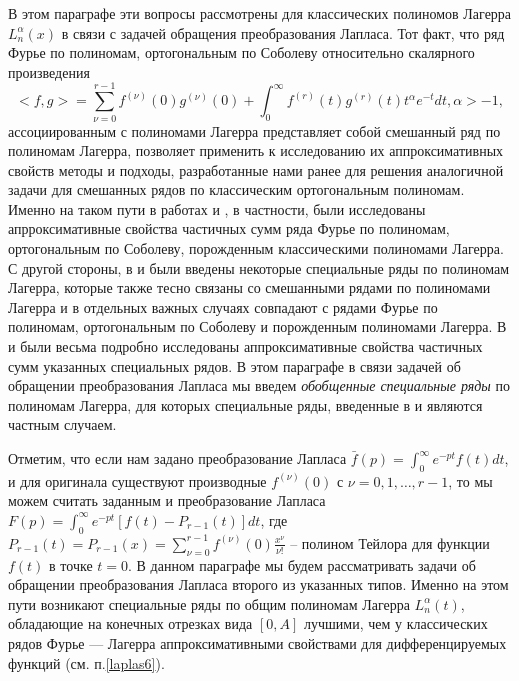 В этом параграфе эти вопросы рассмотрены для классических полиномов Лагерра $L_n^\alpha(x)$ в связи с задачей обращения преобразования Лапласа. Тот факт, что ряд Фурье по полиномам, ортогональным по Соболеву относительно скалярного произведения
\begin{equation}\label{laplas-1.1}
<f,g>=\sum_{\nu=0}^{r-1}f^{(\nu)}(0)g^{(\nu)}(0)+\int_0^\infty f^{(r)}(t)g^{(r)}(t)t^\alpha e^{-t}dt, \alpha>-1,
\end{equation}
ассоциированным с полиномами Лагерра представляет собой смешанный ряд по полиномам Лагерра, позволяет применить к исследованию их аппроксимативных свойств  методы и подходы, разработанные нами ранее \cite{laplas-Shar13, laplas-Shar14, sobleg-Shar15, sobleg-Shar16} для решения аналогичной задачи для смешанных рядов по классическим ортогональным полиномам. Именно на таком пути в работах  \cite{laplas-Shar11} и \cite{sobleg-SHII}, в частности, были исследованы апрроксимативные свойства частичных сумм ряда Фурье по полиномам, ортогональным по Соболеву, порожденным классическими полиномами Лагерра. С другой стороны, в \cite{laplas-Shar11} и \cite{sobleg-SHII} были введены некоторые специальные ряды по полиномам Лагерра, которые также тесно связаны со смешанными рядами по полиномами Лагерра и в отдельных важных случаях совпадают с рядами Фурье по полиномам, ортогональным по Соболеву и порожденным полиномами Лагерра. В \cite{laplas-Shar11} и \cite{sobleg-SHII} были весьма подробно исследованы аппроксимативные свойства частичных сумм указанных специальных рядов. В этом параграфе в связи задачей об обращении преобразования Лапласа мы введем \textit{ обобщенные специальные ряды} по полиномам Лагерра,  для которых специальные ряды, введенные в \cite{laplas-Shar11} и \cite{sobleg-SHII} являются частным случаем.

 Отметим, что если нам задано преобразование Лапласа
$\bar f(p)=\int_0^\infty e^{-pt}f(t)dt$, и для оригинала существуют производные $f^{(\nu)}(0)$ с $\nu=0,1,\ldots, r-1$, то мы можем считать заданным и преобразование Лапласа $F(p)=\int_0^\infty e^{-pt}[f(t)-P_{r-1}(t)]dt$, где $P_{r-1}(t)=P_{r-1}(x)=\sum\nolimits_{\nu=0}^{r-1}f^{(\nu)}(0)\frac{x^\nu}{\nu!}$ -- полином Тейлора для функции $f(t)$ в точке $t=0$. В данном параграфе мы будем рассматривать задачи об обращении преобразования Лапласа второго из указанных типов. Именно на этом пути возникают специальные ряды по общим полиномам Лагерра $L_n^{\alpha}(t)$, обладающие на конечных отрезках вида $[0,A]$ лучшими, чем у классических рядов Фурье --- Лагерра аппроксимативными свойствами для дифференцируемых функций   (см. п.\ref{laplas6}).






